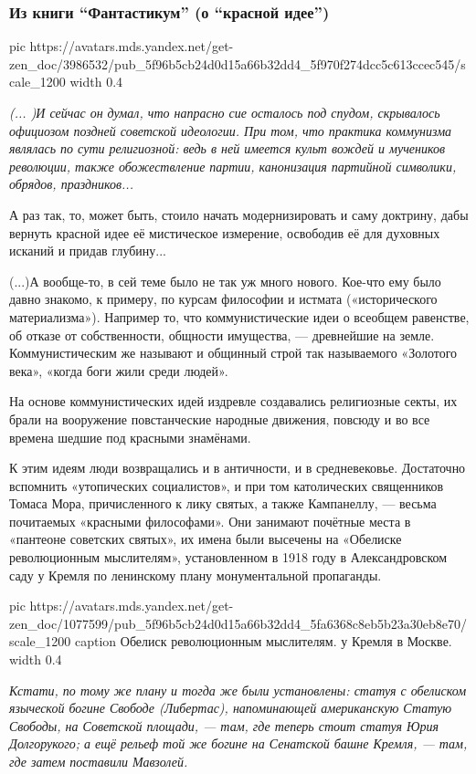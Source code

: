 \subsubsection{Из книги \enquote{Фантастикум} (о \enquote{красной идее})}


\ifcmt
  pic https://avatars.mds.yandex.net/get-zen_doc/3986532/pub_5f96b5cb24d0d15a66b32dd4_5f970f274dcc5c613ccec545/scale_1200
  width 0.4
\fi

\begingroup
   \em
(... )И сейчас он думал, что напрасно сие осталось под спудом, скрывалось
официозом поздней советской идеологии. При том, что практика коммунизма
являлась по сути религиозной: ведь в ней имеется культ вождей и мучеников
революции, также обожествление партии, канонизация партийной символики,
обрядов, праздников...

А раз так, то, может быть, стоило начать модернизировать и саму доктрину, дабы
вернуть красной идее её мистическое измерение, освободив её для духовных
исканий и придав глубину...

(...)А вообще-­то, в сей теме было не так уж много нового. Кое-­что ему было
давно знакомо, к примеру, по курсам философии и истмата («исторического
материализма»). Например то, что коммунистические идеи о всеобщем равенстве, об
отказе от собственности, общности имущества, — древнейшие на земле.
Коммунистическим же называют и общинный строй так называемого «Золотого века»,
«когда боги жили среди людей».

На основе коммунистических идей издревле создавались религиозные секты, их
брали на вооружение повстанческие народные движения, повсюду и во все времена
шедшие под красными знамёнами.

К этим идеям люди возвращались и в античности, и в средневековье. Достаточно
вспомнить «утопических социалистов», и при том католических священников Томаса
Мора, причисленного к лику святых, а также Кампанеллу, — весьма почитаемых
«красными философами». Они занимают почётные места в «пантеоне советских
святых», их имена были высечены на «Обелиске революционным мыслителям»,
установленном в 1918 году в Александровском саду у Кремля по ленинскому плану
монументальной пропаганды. 
\endgroup

\ifcmt
  pic https://avatars.mds.yandex.net/get-zen_doc/1077599/pub_5f96b5cb24d0d15a66b32dd4_5fa6368c8eb5b23a30eb8e70/scale_1200
  caption Обелиск революционным мыслителям. у Кремля в Москве.
  width 0.4
\fi

\begingroup
\em
Кстати, по тому же плану и тогда же были установлены: статуя с обелиском
языческой богине Свободе (Либертас), напоминающей американскую Статую Свободы,
на Советской площади, — там, где теперь стоит статуя Юрия Долгорукого; а ещё
рельеф той же богине на Сенатской башне Кремля, — там, где затем поставили
Мавзолей.

